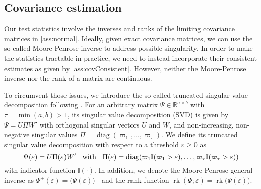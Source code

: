 \documentclass[12pt]{article}
\numberwithin{thm}{section}
\numberwithin{defn}{section}
\numberwithin{lem}{section}
\numberwithin{prop}{section}
\numberwithin{cor}{section}
\numberwithin{rem}{section}
\DeclareMathOperator{\diag}{diag}
\newcommand{\rank}{\operatorname{rk}}
\begin{document}
\vspace{-0.5cm}
\subsection{Covariance estimation} \label{subsec:Cov}
\vspace{-0.3cm}
Our test statistics involve the inverses and ranks of the limiting covariance matrices in \autoref{ass:normal}. Ideally, given exact covariance matrices, we can use the so-called Moore-Penrose inverse to address possible singularity. In order to make the statistics tractable in practice, we need to instead incorporate their consistent estimates as given by \autoref{ass:covConsistent}. However, neither the Moore-Penrose inverse nor the rank of a matrix are continuous. 

To circumvent those issues, we introduce the so-called truncated singular value decomposition following \cite{lutkepohl1997modified}.
For an arbitrary matrix $\Psi \in \mathbb{R}^{a \times b}$ with $\tau = \min(a, b) > 1$, its singular value decomposition (SVD) is given by $\Psi = U \Pi W'$ with orthogonal singular vectors $U$ and $W$, and non-increasing, non-negative singular values $\Pi = \diag(\varpi_1, \dots, \varpi_\tau)$.
We define its truncated singular value decomposition with respect to a threshold $\varepsilon \geq 0$ as 
\begin{equation} \label{eq:truSVD}
\Psi(\varepsilon) = U \Pi(\varepsilon) W'
\hspace{0.2cm}
\text{ with }
\hspace{0.2cm}
\Pi(\varepsilon) = \diag(\varpi_1 \mathbb{I}(\varpi_1 > \varepsilon), \dots, \varpi_\tau \mathbb{I}(\varpi_\tau > \varepsilon))
\end{equation}
with indicator function $\mathbb{I}(\cdot)$. In addition, we denote the Moore-Penrose general inverse as $\Psi^+(\varepsilon) = \big(\Psi(\varepsilon)\big)^+$ and the rank function $\rank(\Psi; \varepsilon) = \rank\big(\Psi(\varepsilon)\big)$. 
\end{document}
